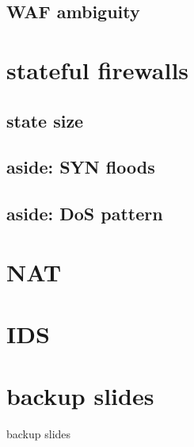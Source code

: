 \date{}
\title{}
\date{}

\begin{frame}
    \titlepage
\end{frame}

\subsection{WAF ambiguity}


\section{stateful firewalls}


\subsection{state size}


\subsection{aside: SYN floods}


\subsection{aside: DoS pattern}


\section{NAT}


\section{IDS}





\section{backup slides}
\begin{frame}{backup slides}
\end{frame}


